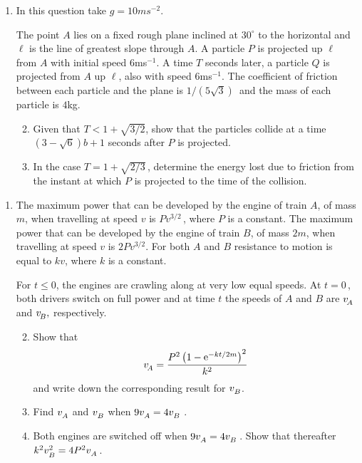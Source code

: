 \documentclass[a4, 11pt]{report}
\newlength{\qspace}
\newcounter{qnumber}
\newenvironment{question}%
 {\vspace{\qspace}
  \begin{enumerate}[\bfseries 1\quad][10]%
    \setcounter{enumi}{\value{qnumber}}%
    \item%
 }
{
  \end{enumerate}
  \filbreak
  \stepcounter{qnumber}
 }
\newenvironment{questionparts}[1][1]%
 {
  \begin{enumerate}[\bfseries (i)]%
    \setcounter{enumii}{#1}
    \addtocounter{enumii}{-1}
    \setlength{\itemsep}{5mm}
    \setlength{\parskip}{8pt}
 }
 {
  \end{enumerate}
 }
\def\e{{\mathrm e}}
\def\le{\leqslant}
\begin{document}
\begin{question}	
In this question take $g = 10 ms^{-2}.$

The point $A$ lies on a fixed rough plane inclined at $30^{\circ}$
to the horizontal and $\ell$ is the line of greatest slope through $A$.
A particle $P$ is projected up $\ell$ from $A$ with initial 
speed $6$ms$^{-1}$.
A time $T$ seconds later, a particle $Q$ is projected from $A$
up $\ell$, also  with speed $6$ms$^{-1}$.  
The coefficient of friction between 
each particle and the plane is $1/(5\sqrt{3})\,$ and the mass of each particle is $4$kg.


\begin{questionparts}
\item Given that $T<1+\sqrt{3/2}$, show 
that the particles collide at a time $(3-\sqrt6)b+1$ seconds
after $P$ is projected.

\item In the case $T=1+\sqrt{2/3}\,$, 
determine the energy lost due to friction from the instant at
which $P$ is projected  to the time of the collision.
\end{questionparts}
\end{question}


\begin{question}
The maximum power that can be developed by the engine 
of train $A$, 
of mass $m$, when travelling at speed $v$ is $Pv^{3/2}\,$, where
$P$ is a constant. 
The maximum power that can be developed by the engine of train $B$, 
of mass $2m$,
when travelling at speed $v$ is  $2Pv^{3/2}.$   For both $A$ and $B$
 resistance to motion is equal to $kv$, where $k$ is a constant.

For $t\le0$, the engines are crawling along at very low equal speeds. 
At $t = 0\,$, both
drivers switch on full power and at time $t$ the speeds of 
$A$ and $B$ are $v_{\vphantom{\dot A}\!A}$ and $v_{\vphantom{\dot B}\hspace{-1pt}B},$ respectively.

\begin{questionparts}
\item
Show that 
\[
v_{\vphantom{\dot A}\!A} = \frac{P^2 \left(1-\e^{-kt/2m}\right)^2}{k^2}
\]
and write down the corresponding result for $v_{\vphantom{\dot B}B}$.

\item Find  $v_{\vphantom{\dot B}A}$ and  $v_{\vphantom{\dot B}B}$
when $9  v_{\vphantom{\dot B}A} =4v_{\vphantom{\dot B}B}\;$.


\item
Both engines are switched off when  $9  v_{\vphantom{\dot B}A} =4v_{\vphantom{\dot B}B}\,$.
Show that thereafter $k^2 v_{\vphantom{\dot B}B}^2 = 4 P^2  v_{\vphantom{\dot B}A}\,$.
 
\end{questionparts}
\end{question}
	
\end{document}

